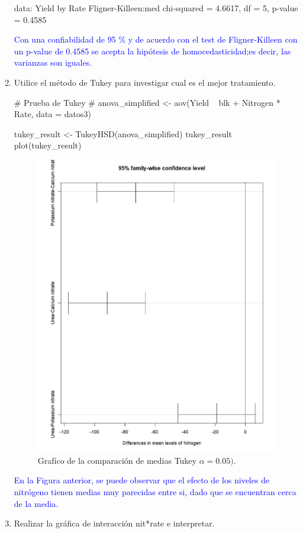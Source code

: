 \documentclass[a4paper,12pt]{article}
\begin{document}
\begin{enumerate}[label=\textbf{\alph*})]
\begin{MyVerbatim}
data:  Yield by Rate
Fligner-Killeen:med chi-squared = 4.6617, df = 5, p-value = 0.4585
\end{MyVerbatim}

\textcolor{blue}{Con una confiabilidad de 95 \% y de acuerdo con el test de Fligner-Killeen con un p-value de 0.4585 se acepta la hipótesis de homocedasticidad;es decir, las varianzas son iguales.}

\item Utilice el método de Tukey para investigar cual es el mejor tratamiento.
\begin{MyVerbatim}
# Prueba de Tukey #
anova_simplified <- aov(Yield ~ blk + Nitrogen * Rate, data = datos3)

tukey_result <- TukeyHSD(anova_simplified)
tukey_result
plot(tukey_result)
\end{MyVerbatim}
\begin{figure}[H]
	\centering
	\includegraphics[width=0.7\linewidth]{prob5_tuke}
	\caption[prob5_tukey]{Grafíco de la comparación de medias Tukey \(\alpha=0.05)\).}
	\label{fig:prob5tuke}
\end{figure}
\textcolor{blue}{En la Figura anterior, se puede observar que el efecto de los niveles de nitrógeno tienen medias muy parecidas entre si, dado que se encuentran cerca de la media.}
\item Realizar la gráfica de interacción nit*rate e interpretar.
\end{enumerate}
\end{document}
